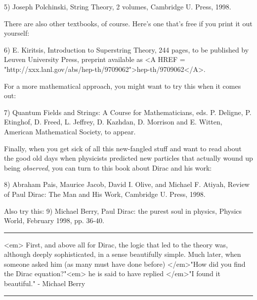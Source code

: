 5) Joseph Polchinski, String Theory, 2 volumes, Cambridge U. Press,
1998.

There are also other textbooks, of course.  Here's one that's free if
you print it out yourself:

6) E. Kiritsis, Introduction to Superstring Theory, 244 pages, 
to be published by Leuven University Press, preprint available
as <A HREF = "http://xxx.lanl.gov/abs/hep-th/9709062">hep-th/9709062</A>.

For a more mathematical approach, you might want to try this when it
comes out:

7) Quantum Fields and Strings: A Course for Mathematicians, eds.
P. Deligne, P. Etinghof, D. Freed, L. Jeffrey, D. Kazhdan, D. Morrison
and E. Witten, American Mathematical Society, to appear.

Finally, when you get sick of all this new-fangled stuff and want 
to read about the good old days when physicists predicted new
particles that actually wound up being \emph{observed}, you can turn to 
this book about Dirac and his work:

8) Abraham Pais, Maurice Jacob, David I. Olive, and Michael F. Atiyah, 
Review of Paul Dirac: The Man and His Work, Cambridge U. Press, 1998.

Also try this:
9) Michael Berry, Paul Dirac: the purest soul in physics, Physics World,
February 1998, pp. 36-40.


 \par\noindent\rule{\textwidth}{0.4pt}
<em> First, and above all for Dirac, the logic that led to the theory was,
although deeply sophisticated, in a sense beautifully simple.
Much later, when someone asked him (as many must have done before)
</em>"How did you find the Dirac equation?"<em> he is said to have
replied </em>"I found it beautiful." - Michael Berry



\par\noindent\rule{\textwidth}{0.4pt}

